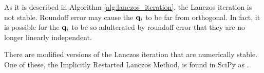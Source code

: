 As it is described in Algorithm \ref{alg:lanczos_iteration}, the Lanczos iteration is not stable.
Roundoff error may cause the $\mathbf{q}_i$ to be far from orthogonal.
In fact, it is possible for the $\mathbf{q}_i$ to be so adulterated by roundoff error that they are no longer linearly independent.

There are modified versions of the Lanczos iteration that are numerically stable.
One of these, the Implicitly Restarted Lanczos Method, is found in SciPy as .
